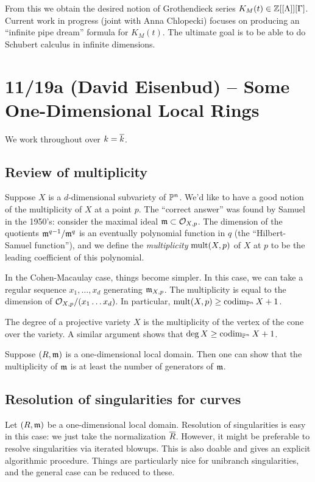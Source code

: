 \documentclass{amsart}
\begin{document}
From this we obtain the desired notion of Grothendieck series $K_M(t) \in \mathbb{Z}[[\Lambda]][\Gamma]$.
Current work in progress (joint with Anna Chlopecki) focuses on producing an ``infinite pipe dream'' formula for $K_M(t)$.
The ultimate goal is to be able to do Schubert calculus in infinite dimensions.

\section{11/19a (David Eisenbud) -- Some One-Dimensional Local Rings}

We work throughout over $k = \overline{k}$.

\subsection{Review of multiplicity}

Suppose $X$ is a $d$-dimensional subvariety of $\mathbb{P}^n$.
We'd like to have a good notion of the multiplicity of $X$ at a point $p$.
The ``correct answer'' was found by Samuel in the 1950's: consider the maximal ideal $\mathfrak{m} \subset \mathcal{O}_{X,p}$.
The dimension of the quotients $\mathfrak{m}^{q-1} / \mathfrak{m}^q$ is an eventually polynomial function in $q$ (the ``Hilbert-Samuel function''), and we define the \emph{multiplicity} $\operatorname{mult}(X, p)$ of $X$ at $p$ to be the leading coefficient of this polynomial.

In the Cohen-Macaulay case, things become simpler.
In this case, we can take a regular sequence $x_1, \dots, x_d$ generating $\mathfrak{m}_{X,p}$.
The multiplicity is equal to the dimension of $\mathcal{O}_{X,p} / (x_1 \dots x_d)$.
In particular, $\operatorname{mult}(X, p) \geq \operatorname{codim}_{\mathbb{P}^n} X + 1$.

The degree of a projective variety $X$ is the multiplicity of the vertex of the cone over the variety.
A similar argument shows that $\deg X \geq \operatorname{codim}_{\mathbb{P}^n} X + 1$.

Suppose $(R, \mathfrak{m})$ is a one-dimensional local domain.
Then one can show that the multiplicity of $\mathfrak{m}$ is at least the number of generators of $\mathfrak{m}$.

\subsection{Resolution of singularities for curves}

Let $(R, \mathfrak{m})$ be a one-dimensional local domain.
Resolution of singularities is easy in this case: we just take the normalization $\overline{R}$.
However, it might be preferable to resolve singularities via iterated blowups.
This is also doable and gives an explicit algorithmic procedure.
Things are particularly nice for unibranch singularities, and the general case can be reduced to these.
\end{document}
